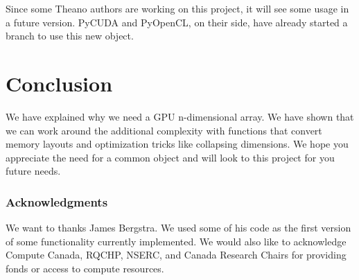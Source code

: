 \documentclass{article} %
\begin{document}
Since some Theano authors are working on this project, it will see some usage in a future version. PyCUDA and PyOpenCL, on their side, have already started a branch to use this new object.

\section{Conclusion}

We have explained why we need a GPU n-dimensional array.
We have shown that we can work around the additional complexity with functions that convert memory layouts and optimization tricks like collapsing dimensions.
We hope you appreciate the need for a common object and will look to this project for you future needs.

\subsubsection*{Acknowledgments}

We want to thanks James Bergstra. We used some of his code as the first version of some functionality currently implemented. We would also like to acknowledge Compute Canada, RQCHP, NSERC, and Canada Research Chairs for providing fonds or access to compute resources.




\end{document}
